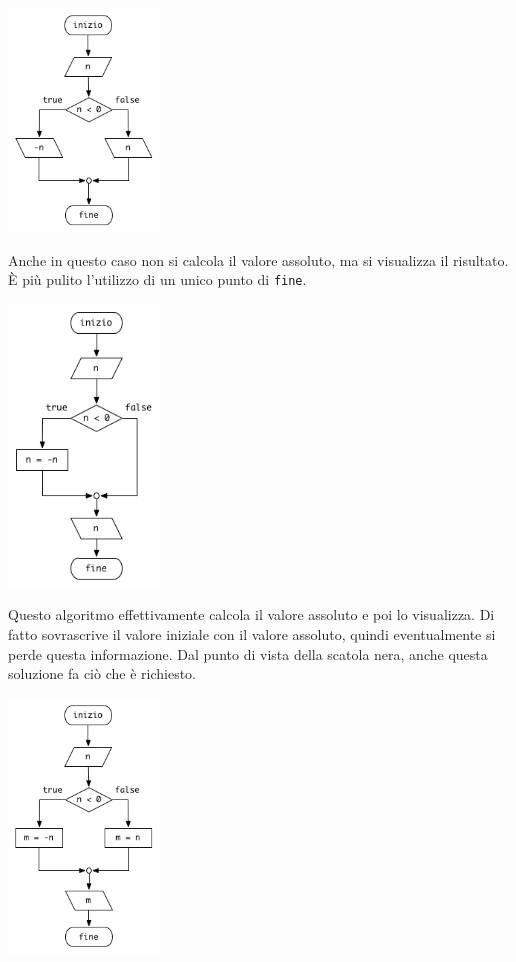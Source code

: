 \begin{center}
    \includegraphics[width=0.3\textwidth]{./abs-alg2.png}
\end{center}

Anche in questo caso non si calcola il valore assoluto, ma si visualizza il risultato. \`E pi\`u pulito l'utilizzo di un unico punto di \texttt{fine}.

\begin{center}
    \includegraphics[width=0.3\textwidth]{./abs-alg3.png}
\end{center}

Questo algoritmo effettivamente calcola il valore assoluto e poi lo visualizza. Di fatto sovrascrive il valore iniziale con il valore assoluto, quindi eventualmente si perde questa informazione. Dal punto di vista della scatola nera, anche questa soluzione fa ci\`o che \`e richiesto.

\begin{center}
    \includegraphics[width=0.3\textwidth]{./abs-alg4.png}
\end{center}

